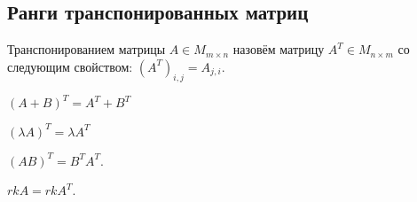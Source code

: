 \subsection{Ранги транспонированных матриц}
\begin{definition}
    Транспонированием матрицы $A\in M_{m\times n}$ назовём
    матрицу $A^T\in M_{n\times m}$ со следующим свойством:
    $(A^T)_{i,j} = A_{j,i}$.
\end{definition}
\begin{properties}
    \item $(A + B)^T = A^T + B^T$
    \item $(\lambda A)^T=\lambda A^T$
    \item $(AB)^T = B^TA^T$.
\end{properties}
\begin{theorem}
    $rkA = rkA^T$.
\end{theorem}
